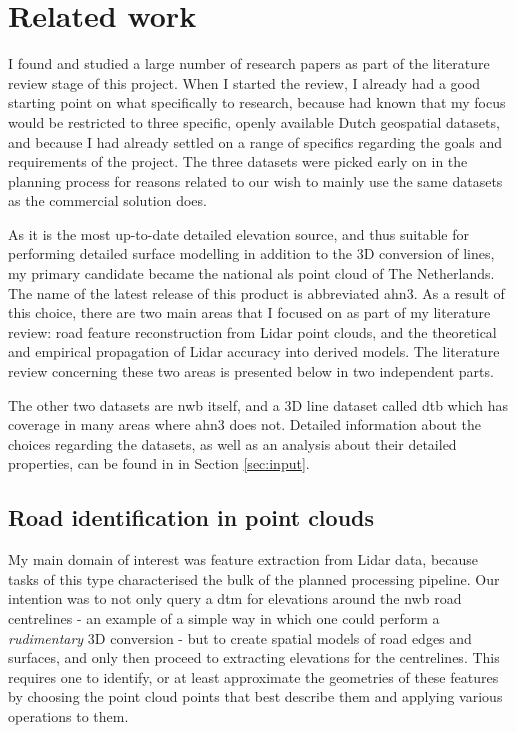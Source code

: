 
\chapter{Related work}
\label{chap:rw}

I found and studied a large number of research papers as part of the literature review stage of this project. When I started the review, I already had a good starting point on what specifically to research, because had known that my focus would be restricted to three specific, openly available Dutch geospatial datasets, and because I had already settled on a range of specifics regarding the goals and requirements of the project. The three datasets were picked early on in the planning process for reasons related to our wish to mainly use the same datasets as the commercial solution does.

As it is the most up-to-date detailed elevation source, and thus suitable for performing detailed surface modelling in addition to the 3D conversion of lines, my primary candidate became the national \ac{als} point cloud of The Netherlands. The name of the latest release of this product is abbreviated \ac{ahn3}. As a result of this choice, there are two main areas that I focused on as part of my literature review: road feature reconstruction from Lidar point clouds, and the theoretical and empirical propagation of Lidar accuracy into derived models. The literature review concerning these two areas is presented below in two independent parts.

The other two datasets are \ac{nwb} itself, and a 3D line dataset called \ac{dtb} which has coverage in many areas where \ac{ahn3} does not. Detailed information about the choices regarding the datasets, as well as an analysis about their detailed properties, can be found in in Section \ref{sec:input}.

\section{Road identification in point clouds}
\label{sec:roadidentification}

My main domain of interest was feature extraction from Lidar data, because tasks of this type characterised the bulk of the planned processing pipeline. Our intention was to not only query a \ac{dtm} for elevations around the \ac{nwb} road centrelines - an example of a simple way in which one could perform a \textit{rudimentary} 3D conversion - but to create spatial models of road edges and surfaces, and only then proceed to extracting elevations for the centrelines. This requires one to identify, or at least approximate the geometries of these features by choosing the point cloud points that best describe them and applying various operations to them.

